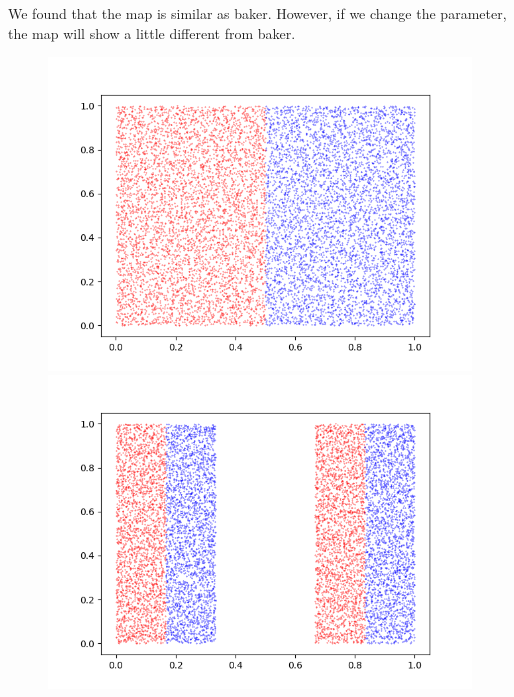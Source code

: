 \documentclass[12pt]{article}
\theoremstyle{plain}
\begin{document}
We found that the map is similar as baker. However, if we change the parameter, the map will show a little different from baker.\\[2ex]



\begin{figure}[H]
\begin{minipage}[c][0.24\width]{
   0.24\textwidth}
   \centering
   \includegraphics[width=1\textwidth]{figure/section5/baker-0.png}
\end{minipage}
\begin{minipage}[c][0.24\width]{
   0.24\textwidth}
   \centering
   \includegraphics[width=1\textwidth]{figure/section5/baker-1-0*33-0*67.png}
\end{minipage}

\end{figure}
\end{document}
